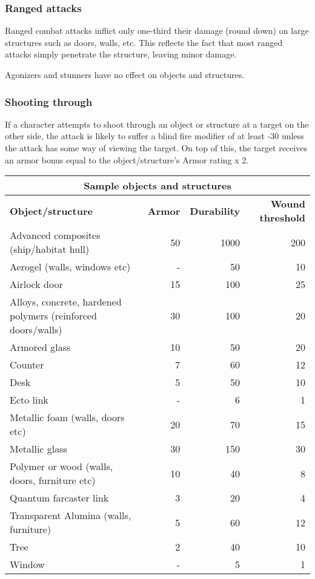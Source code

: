 \subsubsection{Ranged attacks}

Ranged combat attacks inflict only one-third their damage (round down) on large structures such as doors, walls, etc. This reflects the fact that most ranged attacks simply penetrate the structure, leaving minor damage.

Agonizers and stunners have no effect on objects and structures.

\subsubsection{Shooting through}

If a character attempts to shoot through an object or structure at a target on the other side, the attack is likely to suffer a blind fire modifier of at least -30 unless the attack has some way of viewing the target. On top of this, the target receives an armor bonus equal to the object/structure’s Armor rating x 2.

\begin{table} \begin{tabular}{|l|r|r|r|}
\hline \multicolumn{4}{|c|}{\textbf{Sample objects and structures}} \\
\hline \textbf{Object/structure}  & \textbf{Armor} & \textbf{Durability} & \textbf{Wound threshold} \\
\hline Advanced composites (ship/habitat hull)					& 50	& 1000	& 200 \\
\hline Aerogel (walls, windows etc)							& -	& 50		& 10 \\
\hline Airlock door											& 15	& 100	& 25 \\
\hline Alloys, concrete, hardened polymers (reinforced  doors/walls)	& 30	& 100	& 20 \\
\hline Armored glass										& 10	& 50		& 20 \\
\hline Counter												& 7	& 60		& 12 \\
\hline Desk												& 5	& 50		& 10 \\
\hline Ecto link											& -	& 6		& 1 \\
\hline Metallic foam (walls, doors etc)							& 20	& 70		& 15 \\
\hline Metallic glass & 30 & 150 & 30 \\
\hline Polymer or wood (walls, doors, furniture etc)				& 10	& 40		& 8 \\
\hline Quantum farcaster link									& 3	& 20		& 4 \\
\hline Transparent Alumina (walls, furniture)					& 5	& 60		& 12 \\
\hline Tree												& 2	& 40		& 10 \\
\hline Window												& -	& 5		& 1 \\
\hline
\end{tabular}
\label{table:sample-objects-structures}
\end{table}

